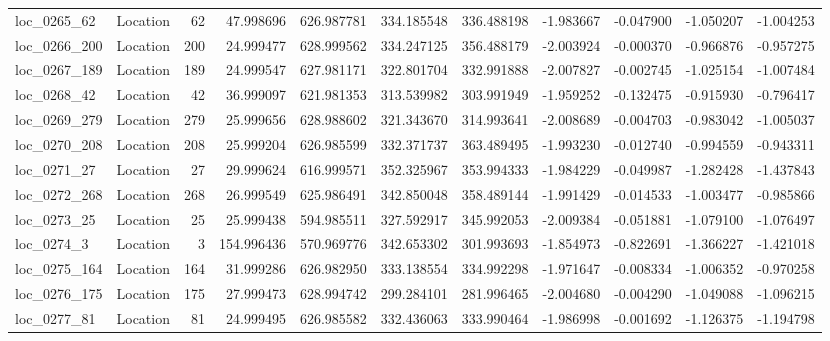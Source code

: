 \begin{tabular}{llrrrrrrrrr}
  loc_0265_62 &        Location &              62 &  47.998696 & 626.987781 &  334.185548 &    336.488198 &  -1.983667 &  -0.047900 &   -1.050207 &     -1.004253 \\
 loc_0266_200 &        Location &             200 &  24.999477 & 628.999562 &  334.247125 &    356.488179 &  -2.003924 &  -0.000370 &   -0.966876 &     -0.957275 \\
 loc_0267_189 &        Location &             189 &  24.999547 & 627.981171 &  322.801704 &    332.991888 &  -2.007827 &  -0.002745 &   -1.025154 &     -1.007484 \\
  loc_0268_42 &        Location &              42 &  36.999097 & 621.981353 &  313.539982 &    303.991949 &  -1.959252 &  -0.132475 &   -0.915930 &     -0.796417 \\
 loc_0269_279 &        Location &             279 &  25.999656 & 628.988602 &  321.343670 &    314.993641 &  -2.008689 &  -0.004703 &   -0.983042 &     -1.005037 \\
 loc_0270_208 &        Location &             208 &  25.999204 & 626.985599 &  332.371737 &    363.489495 &  -1.993230 &  -0.012740 &   -0.994559 &     -0.943311 \\
  loc_0271_27 &        Location &              27 &  29.999624 & 616.999571 &  352.325967 &    353.994333 &  -1.984229 &  -0.049987 &   -1.282428 &     -1.437843 \\
 loc_0272_268 &        Location &             268 &  26.999549 & 625.986491 &  342.850048 &    358.489144 &  -1.991429 &  -0.014533 &   -1.003477 &     -0.985866 \\
  loc_0273_25 &        Location &              25 &  25.999438 & 594.985511 &  327.592917 &    345.992053 &  -2.009384 &  -0.051881 &   -1.079100 &     -1.076497 \\
   loc_0274_3 &        Location &               3 & 154.996436 & 570.969776 &  342.653302 &    301.993693 &  -1.854973 &  -0.822691 &   -1.366227 &     -1.421018 \\
 loc_0275_164 &        Location &             164 &  31.999286 & 626.982950 &  333.138554 &    334.992298 &  -1.971647 &  -0.008334 &   -1.006352 &     -0.970258 \\
 loc_0276_175 &        Location &             175 &  27.999473 & 628.994742 &  299.284101 &    281.996465 &  -2.004680 &  -0.004290 &   -1.049088 &     -1.096215 \\
  loc_0277_81 &        Location &              81 &  24.999495 & 626.985582 &  332.436063 &    333.990464 &  -1.986998 &  -0.001692 &   -1.126375 &     -1.194798 \\

\end{tabular}
